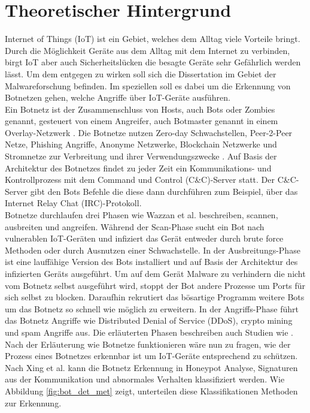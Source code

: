\section{Theoretischer Hintergrund}
\label{sec:theory}

Internet of Things (IoT) ist ein Gebiet, welches dem Alltag viele Vorteile bringt. Durch die Möglichkeit
Geräte aus dem Alltag mit dem Internet zu verbinden, birgt IoT aber auch Sicherheitslücken die besagte Geräte sehr Gefährlich
werden lässt. Um dem entgegen zu wirken soll sich die Dissertation im Gebiet der Malwareforschung befinden. Im speziellen soll es dabei um 
die Erkennung von Botnetzen gehen, welche Angriffe über IoT-Geräte ausführen. \\
Ein Botnetz ist der Zusammenschluss von Hosts, auch Bots oder Zombies genannt, gesteuert von einem Angreifer, auch Botmaster genannt in einem 
Overlay-Netzwerk \cite{Xing2021SurveyOB}. Die Botnetze nutzen Zero-day Schwachstellen, Peer-2-Peer Netze, Phishing Angriffe, Anonyme Netzwerke,
Blockchain Netzwerke und Stromnetze zur Verbreitung und ihrer Verwendungszwecke \cite{DBLP:conf/cycon/CasenoveM14,DBLP:conf/esorics/KurtECAU20}. Auf Basis der Architektur 
des Botnetzes findet zu jeder Zeit ein Kommunikations- und Kontrollprozess mit dem Command und Control (C\&C)-Server statt. Der C\&C-Server gibt den Bots Befehle die 
diese dann durchführen \cite{SCHILLER200729} zum Beispiel, über das Internet Relay Chat (IRC)-Protokoll. \\ Botnetze durchlaufen drei Phasen wie Wazzan et al. 
\cite{Wazzan2021InternetOT} beschreiben, scannen, ausbreiten und angreifen. Während der Scan-Phase sucht ein Bot nach vulnerablen IoT-Geräten und 
infiziert das Gerät entweder durch brute force Methoden oder durch Ausnutzen einer Schwachstelle.
In der Ausbreitungs-Phase ist eine lauffähige Version des Bots installiert und auf Basis der Architektur des infizierten Geräts ausgeführt.
Um auf dem Gerät Malware zu verhindern die nicht vom Botnetz selbst ausgeführt wird, stoppt der Bot andere Prozesse um Ports für sich selbst zu blocken. 
Daraufhin rekrutiert das bösartige Programm weitere Bots um das Botnetz so schnell wie möglich zu erweitern. In der Angriffs-Phase führt das Botnetz Angriffe wie Distributed Denial of 
Service (DDoS), crypto mining und spam Angriffe aus. Die erläuterten Phasen beschreiben auch Studien wie 
\cite{10.1007/978-3-030-33229-7_21, Alzahrani2020,DBLP:journals/computer/VlajicZ18,NGUYEN2020128}. \\
Nach der Erläuterung wie Botnetze funktionieren wäre nun zu fragen, wie der Prozess eines Botnetzes erkennbar ist um IoT-Geräte entsprechend zu schützen. 
Nach Xing et al. \cite{Xing2021SurveyOB} kann die Botnetz Erkennung in Honeypot Analyse, Signaturen aus der Kommunikation und abnormales Verhalten klassifiziert
werden. Wie Abbildung \ref{fig:bot_det_met} zeigt, unterteilen diese Klassifikationen Methoden zur Erkennung. 

